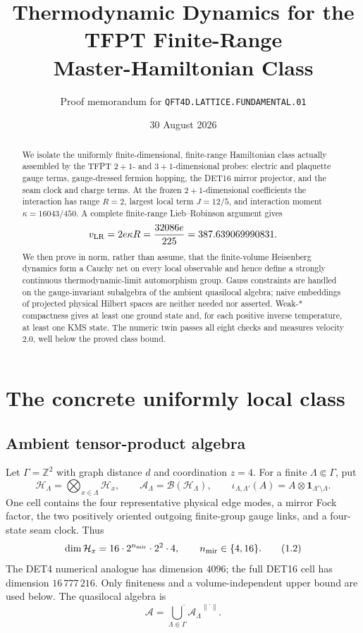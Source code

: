 \documentclass[11pt]{article}
\title{Thermodynamic Dynamics for the TFPT Finite-Range\\
Master-Hamiltonian Class}
\author{Proof memorandum for \texttt{QFT4D.LATTICE.FUNDAMENTAL.01}}
\date{30 August 2026}
\theoremstyle{remark}
\newcommand{\A}{\mathcal A}
\newcommand{\Hh}{\mathcal H}
\newcommand{\Z}{\mathbb Z}
\newcommand{\id}{\mathbf 1}
\newcommand{\norm}[1]{\left\lVert#1\right\rVert}
\begin{document}
\maketitle

\begin{abstract}
We isolate the uniformly finite-dimensional, finite-range Hamiltonian class
actually assembled by the TFPT \(2+1\)- and \(3+1\)-dimensional probes:
electric and plaquette gauge terms, gauge-dressed fermion hopping, the
DET16 mirror projector, and the seam clock and charge terms.  At the frozen
\(2+1\)-dimensional coefficients the interaction has range \(R=2\), largest
local term \(J=12/5\), and interaction moment
\(\kappa=16043/450\).  A complete finite-range Lieb--Robinson argument gives
\[
 v_{\rm LR}=2e\kappa R=\frac{32086e}{225}
 =387.639069990831.
\]
We then prove in norm, rather than assume, that the finite-volume
Heisenberg dynamics form a Cauchy net on every local observable and hence
define a strongly continuous thermodynamic-limit automorphism group.
Gauss constraints are handled on the gauge-invariant subalgebra of the
ambient quasilocal algebra; naive embeddings of projected physical Hilbert
spaces are neither needed nor asserted.  Weak-* compactness gives at least
one ground state and, for each positive inverse temperature, at least one
KMS state.  The numeric twin passes all eight checks and measures velocity
\(2.0\), well below the proved class bound.
\end{abstract}

\tableofcontents

\section{The concrete uniformly local class}

\subsection{Ambient tensor-product algebra}

Let \(\Gamma=\Z^2\) with graph distance \(d\) and coordination \(z=4\).
For a finite \(\Lambda\Subset\Gamma\), put
\[
 \Hh_\Lambda=\bigotimes_{x\in\Lambda}\Hh_x,\qquad
 \A_\Lambda=\mathcal B(\Hh_\Lambda),
 \qquad
 \iota_{\Lambda,\Lambda'}(A)=A\otimes\id_{\Lambda'\setminus\Lambda}.
\tag{1.1}\label{eq:ambient}
\]
One cell contains the four representative physical edge modes, a mirror
Fock factor, the two positively oriented outgoing finite-group gauge links,
and a four-state seam clock.  Thus
\[
 \dim\Hh_x=16\cdot 2^{n_{\rm mir}}\cdot 2^2\cdot4,
 \qquad n_{\rm mir}\in\{4,16\}.
\tag{1.2}\label{eq:localdim}
\]
The DET4 numerical analogue has dimension \(4096\); the full DET16 cell has
dimension \(16\,777\,216\).  Only finiteness and a volume-independent upper
bound are used below.  The quasilocal algebra is
\[
 \A=\overline{\bigcup_{\Lambda\Subset\Gamma}\A_\Lambda}^{\norm{\cdot}}.
\tag{1.3}\label{eq:quasilocal}
\]
\end{document}
